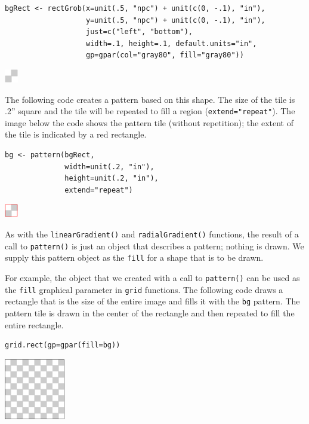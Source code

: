 \begin{verbatim}
bgRect <- rectGrob(x=unit(.5, "npc") + unit(c(0, -.1), "in"),
                   y=unit(.5, "npc") + unit(c(0, -.1), "in"),
                   just=c("left", "bottom"),
                   width=.1, height=.1, default.units="in",
                   gp=gpar(col="gray80", fill="gray80"))
\end{verbatim}

\includegraphics{murrell-definitions-2023_files/figure-latex/unnamed-chunk-9-1.png}

The following code creates a pattern based on this shape.
The size of the tile is .2'' square and the tile will be repeated
to fill a region
(\texttt{extend="repeat"}).
The image below the code shows the pattern tile (without repetition);
the extent of the tile is indicated by a red rectangle.

\begin{verbatim}
bg <- pattern(bgRect,
              width=unit(.2, "in"),
              height=unit(.2, "in"),
              extend="repeat")
\end{verbatim}

\includegraphics{murrell-definitions-2023_files/figure-latex/unnamed-chunk-11-1.png}

As with the \texttt{linearGradient()} and \texttt{radialGradient()} functions,
the result of a call to \texttt{pattern()} is just an object that describes a pattern;
nothing is drawn. We supply this pattern object as the \texttt{fill} for a shape
that is to be drawn.

For example, the object that we created with a call
to \texttt{pattern()} can be used as the \texttt{fill} graphical parameter
in \texttt{grid} functions. The following code draws a rectangle that is
the size of the entire image and fills it with the \texttt{bg} pattern.
The pattern tile is drawn in the center of the rectangle and
then repeated to fill the entire rectangle.

\begin{verbatim}
grid.rect(gp=gpar(fill=bg))  
\end{verbatim}

\includegraphics{murrell-definitions-2023_files/figure-latex/unnamed-chunk-12-1.png}

